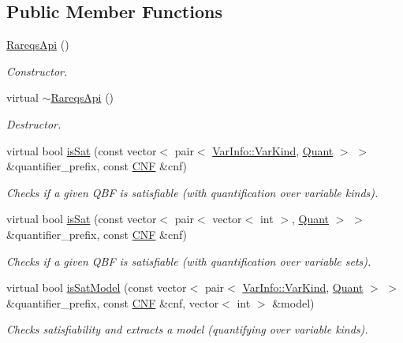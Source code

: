 \subsection*{Public Member Functions}
\begin{DoxyCompactItemize}
\item 
\hyperlink{classRareqsApi_a3f268111001fef7865ca04d2741e827d}{Rareqs\-Api} ()
\begin{DoxyCompactList}\small\item\em Constructor. \end{DoxyCompactList}\item 
virtual \hyperlink{classRareqsApi_a8bd8702c81463bff36b4b9db8cd055bf}{$\sim$\-Rareqs\-Api} ()
\begin{DoxyCompactList}\small\item\em Destructor. \end{DoxyCompactList}\item 
virtual bool \hyperlink{classRareqsApi_a90fa7a7affc2a12a287cea15d7f651c7}{is\-Sat} (const vector$<$ pair$<$ \hyperlink{classVarInfo_a64d1da76cf84fe674e5fef9764ef11cf}{Var\-Info\-::\-Var\-Kind}, \hyperlink{classQBFSolver_ac091e263cb55286cc07b2451bcf4d3c7}{Quant} $>$ $>$ \&quantifier\-\_\-prefix, const \hyperlink{classCNF}{C\-N\-F} \&cnf)
\begin{DoxyCompactList}\small\item\em Checks if a given Q\-B\-F is satisfiable (with quantification over variable kinds). \end{DoxyCompactList}\item 
virtual bool \hyperlink{classRareqsApi_a090cdbd8cfe16e475c29240a50f690fe}{is\-Sat} (const vector$<$ pair$<$ vector$<$ int $>$, \hyperlink{classQBFSolver_ac091e263cb55286cc07b2451bcf4d3c7}{Quant} $>$ $>$ \&quantifier\-\_\-prefix, const \hyperlink{classCNF}{C\-N\-F} \&cnf)
\begin{DoxyCompactList}\small\item\em Checks if a given Q\-B\-F is satisfiable (with quantification over variable sets). \end{DoxyCompactList}\item 
virtual bool \hyperlink{classRareqsApi_a243411cd4a5cc417f9fc12089b8381b8}{is\-Sat\-Model} (const vector$<$ pair$<$ \hyperlink{classVarInfo_a64d1da76cf84fe674e5fef9764ef11cf}{Var\-Info\-::\-Var\-Kind}, \hyperlink{classQBFSolver_ac091e263cb55286cc07b2451bcf4d3c7}{Quant} $>$ $>$ \&quantifier\-\_\-prefix, const \hyperlink{classCNF}{C\-N\-F} \&cnf, vector$<$ int $>$ \&model)
\begin{DoxyCompactList}\small\item\em Checks satisfiability and extracts a model (quantifying over variable kinds). \end{DoxyCompactList}\item 

\end{DoxyCompactItemize}
